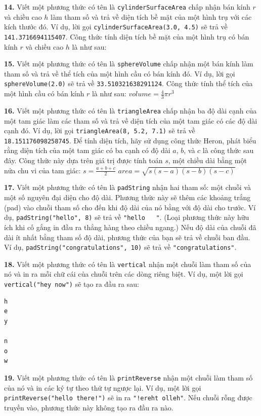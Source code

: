 \textbf{14.} Viết một phương thức có tên là \texttt{cylinderSurfaceArea}
chấp nhận bán kính \(r\) và chiều cao \(h\) làm tham số và trả về diện
tích bề mặt của một hình trụ với các kích thước đó. Ví dụ, lời gọi
\texttt{cylinderSurfaceArea(3.0,\ 4.5)} sẽ trả về
\texttt{141.3716694115407}. Công thức tính diện tích bề mặt của một hình
trụ có bán kính \(r\) và chiều cao \(h\) là như sau:

\textbf{15.} Viết một phương thức có tên là \texttt{sphereVolume} chấp
nhận một bán kính làm tham số và trả về thể tích của một hình cầu có bán
kính đó. Ví dụ, lời gọi \texttt{sphereVolume(2.0)} sẽ trả về
\texttt{33.510321638291124}. Công thức tính thể tích của một hình cầu có
bán kính \(r\) là như sau: \(volume = \frac{4}{3}\pi r^3\)

\textbf{16.} Viết một phương thức có tên là \texttt{triangleArea} chấp
nhận ba độ dài cạnh của một tam giác làm các tham số và trả về diện tích
của một tam giác có các độ dài cạnh đó. Ví dụ, lời gọi
\texttt{triangleArea(8,\ 5.2,\ 7.1)} sẽ trả về
\texttt{18.151176098258745}. Để tính diện tích, hãy sử dụng công thức
Heron, phát biểu rằng diện tích của một tam giác có ba cạnh có độ dài
\(a\), \(b\), và \(c\) là công thức sau đây. Công thức này dựa trên giá
trị được tính toán \(s\), một chiều dài bằng một nửa chu vi của tam
giác: \(s = \frac{a + b + c}{2}\)
\(area = \sqrt{s(s - a)(s - b)(s - c)}\)

\textbf{17.} Viết một phương thức có tên là \texttt{padString} nhận hai
tham số: một chuỗi và một số nguyên đại diện cho độ dài. Phương thức này
sẽ thêm các khoảng trắng (pad) vào chuỗi tham số cho đến khi độ dài của
nó bằng với độ dài cho trước. Ví dụ, \texttt{padString("hello",\ 8)} sẽ
trả về \texttt{"hello\ \ \ "}. (Loại phương thức này hữu ích khi cố gắng
in đầu ra thẳng hàng theo chiều ngang.) Nếu độ dài của chuỗi đã dài ít
nhất bằng tham số độ dài, phương thức của bạn sẽ trả về chuỗi ban đầu.
Ví dụ, \texttt{padString("congratulations",\ 10)} sẽ trả về
\texttt{"congratulations"}.

\textbf{18.} Viết một phương thức có tên là \texttt{vertical} nhận một
chuỗi làm tham số của nó và in ra mỗi chữ cái của chuỗi trên các dòng
riêng biệt. Ví dụ, một lời gọi \texttt{vertical("hey\ now")} sẽ tạo ra
đầu ra sau:

\begin{verbatim}
h
e
y
 
n
o
w
\end{verbatim}

\textbf{19.} Viết một phương thức có tên là \texttt{printReverse} nhận
một chuỗi làm tham số của nó và in các ký tự theo thứ tự ngược lại. Ví
dụ, một lời gọi \texttt{printReverse("hello\ there!")} sẽ in ra
\texttt{"!ereht\ olleh"}. Nếu chuỗi rỗng được truyền vào, phương thức
này không tạo ra đầu ra nào.

